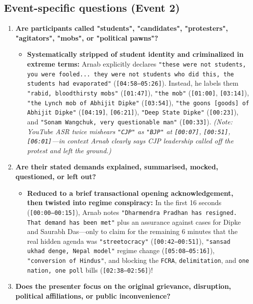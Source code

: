 \documentclass[10pt,a4paper]{article}
\begin{document}
\subsection*{Event-specific questions (Event 2)}
\begin{enumerate}[leftmargin=1.6em, itemsep=4pt, topsep=4pt]
  \item \textbf{Are participants called "students", "candidates", "protesters", "agitators", "mobs", or "political pawns"?}
  \begin{itemize}[leftmargin=1.4em, itemsep=2pt, topsep=2pt]
    \item \textbf{Systematically stripped of student identity and criminalized in extreme terms:} Arnab explicitly declares \texttt{"these were not students, you were fooled... they were not students who did this, the students had evaporated"} (\texttt{[04:58--05:26]}). Instead, he labels them \texttt{"rabid, bloodthirsty mobs"} (\texttt{[01:47]}), \texttt{"the mob"} (\texttt{[01:00]}, \texttt{[03:14]}), \texttt{"the Lynch mob of Abhijit Dipke"} (\texttt{[03:54]}), \texttt{"the goons [goods] of Abhijit Dipke"} (\texttt{[04:19]}, \texttt{[06:21]}), \texttt{"Deep State Dipke"} (\texttt{[00:23]}), and \texttt{"Sonam Wangchuk, very questionable man"} (\texttt{[00:33]}). \textit{(Note: YouTube ASR twice mishears \texttt{"CJP"} as \texttt{"BJP"} at \texttt{[00:07]}, \texttt{[00:51]}, \texttt{[06:01]}---in context Arnab clearly says CJP leadership called off the protest and left the ground.)}
  \end{itemize}
  \item \textbf{Are their stated demands explained, summarised, mocked, questioned, or left out?}
  \begin{itemize}[leftmargin=1.4em, itemsep=2pt, topsep=2pt]
    \item \textbf{Reduced to a brief transactional opening acknowledgement, then twisted into regime conspiracy:} In the first 16 seconds (\texttt{[00:00--00:15]}), Arnab notes \texttt{"Dharmendra Pradhan has resigned. That demand has been met"} plus an assurance against cases for Dipke and Saurabh Das---only to claim for the remaining 6 minutes that the real hidden agenda was \texttt{"streetocracy"} (\texttt{[00:42--00:51]}), \texttt{"sansad ukhad denge, Nepal model"} regime change (\texttt{[05:08--05:16]}), \texttt{"conversion of Hindus"}, and blocking the \texttt{FCRA}, \texttt{delimitation}, and \texttt{one nation, one poll} bills (\texttt{[02:38--02:56]})!
  \end{itemize}
  \item \textbf{Does the presenter focus on the original grievance, disruption, political affiliations, or public inconvenience?}

\end{enumerate}
\end{document}

